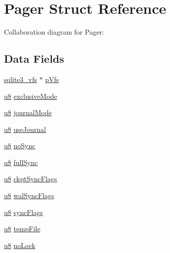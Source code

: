 \hypertarget{struct_pager}{}\section{Pager Struct Reference}
\label{struct_pager}


Collaboration diagram for Pager\+:
\subsection*{Data Fields}
\begin{DoxyCompactItemize}
\item 
\hyperlink{structsqlite3__vfs}{sqlite3\+\_\+vfs} $\ast$ \hyperlink{struct_pager_a59603ca1cedf2bda0ee4e65eb610a0b5}{p\+Vfs}
\item 
\hyperlink{sqlite3_8c_a74a0f6424ae628af25f23f0a35f6ead3}{u8} \hyperlink{struct_pager_a97470c2be335613df4fd3af652fa60dc}{exclusive\+Mode}
\item 
\hyperlink{sqlite3_8c_a74a0f6424ae628af25f23f0a35f6ead3}{u8} \hyperlink{struct_pager_a0554b570563ec30be50c2c5901bba799}{journal\+Mode}
\item 
\hyperlink{sqlite3_8c_a74a0f6424ae628af25f23f0a35f6ead3}{u8} \hyperlink{struct_pager_a931b7472041e2b8b26dfc9a52c16b108}{use\+Journal}
\item 
\hyperlink{sqlite3_8c_a74a0f6424ae628af25f23f0a35f6ead3}{u8} \hyperlink{struct_pager_aa87063f84c94b21b9d571bf858a4a697}{no\+Sync}
\item 
\hyperlink{sqlite3_8c_a74a0f6424ae628af25f23f0a35f6ead3}{u8} \hyperlink{struct_pager_ae32bce1abb3f600be3349121c138deb6}{full\+Sync}
\item 
\hyperlink{sqlite3_8c_a74a0f6424ae628af25f23f0a35f6ead3}{u8} \hyperlink{struct_pager_a8a12bb12711fc9df4c228d0a8ce6c274}{ckpt\+Sync\+Flags}
\item 
\hyperlink{sqlite3_8c_a74a0f6424ae628af25f23f0a35f6ead3}{u8} \hyperlink{struct_pager_a754c6f3e9c986c552655557f044109e2}{wal\+Sync\+Flags}
\item 
\hyperlink{sqlite3_8c_a74a0f6424ae628af25f23f0a35f6ead3}{u8} \hyperlink{struct_pager_ac97576f0f90c31296207602245d41195}{sync\+Flags}
\item 
\hyperlink{sqlite3_8c_a74a0f6424ae628af25f23f0a35f6ead3}{u8} \hyperlink{struct_pager_a9d9740be8094db2eea335d9dc9bada1b}{temp\+File}
\item 
\hyperlink{sqlite3_8c_a74a0f6424ae628af25f23f0a35f6ead3}{u8} \hyperlink{struct_pager_a1374f5f38b4d4a4dd63a597f7e097610}{no\+Lock}
\item 

\end{DoxyCompactItemize}
